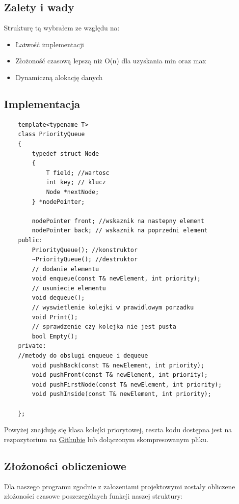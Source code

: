 \documentclass{article}
\begin{document}
\subsection{Zalety i wady}
Strukturę tą wybrałem ze względu na:
\begin{itemize}
    \item Łatwość implementacji
    \item Złożoność czasową lepszą niż O(n) dla uzyskania min oraz max
    \item Dynamiczną alokację danych
\end{itemize}


\subsection{Implementacja}

\begin{lstlisting}
    template<typename T>
    class PriorityQueue
    {
        typedef struct Node
        {
            T field; //wartosc 
            int key; // klucz
            Node *nextNode; 
        } *nodePointer;
    
        nodePointer front; //wskaznik na nastepny element
        nodePointer back; // wskaznik na poprzedni element
    public:
        PriorityQueue(); //konstruktor
        ~PriorityQueue(); //destruktor
        // dodanie elementu
        void enqueue(const T& newElement, int priority); 
        // usuniecie elementu
        void dequeue(); 
        // wyswietlenie kolejki w prawidlowym porzadku
        void Print(); 
        // sprawdzenie czy kolejka nie jest pusta
        bool Empty(); 
    private:
    //metody do obslugi enqueue i dequeue
        void pushBack(const T& newElement, int priority); 
        void pushFront(const T& newElement, int priority);
        void pushFirstNode(const T& newElement, int priority);
        void pushInside(const T& newElement, int priority);
        
    };
    \end{lstlisting}
    
Powyżej znajduję się klasa kolejki priorytowej, reszta kodu dostępna jest na 
rezpozytorium na \href{https://github.com/Damiry0/PAMSI}{Githubie} lub dołączonym skompresowanym pliku.
\subsection{Złożoności obliczeniowe}
Dla naszego programu zgodnie z załozeniami projektowymi zostały obliczene złożoności czasowe poszczególnych 
funkcji naszej struktury:
\end{document}
